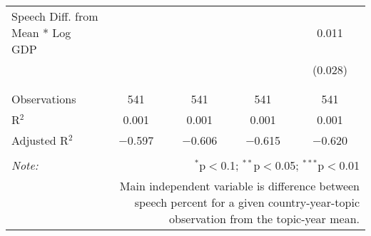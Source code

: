 \begin{table}[!htbp]
\begin{tabular}{@{\extracolsep{5pt}}lcccc}
 Speech Diff. from Mean * Log GDP &  &  &  & 0.011 \\ 
  &  &  &  & (0.028) \\ 
  & & & & \\ 
\hline \\[-1.8ex] 
Observations & 541 & 541 & 541 & 541 \\ 
R$^{2}$ & 0.001 & 0.001 & 0.001 & 0.001 \\ 
Adjusted R$^{2}$ & $-$0.597 & $-$0.606 & $-$0.615 & $-$0.620 \\ 
\hline 
\hline \\[-1.8ex] 
\textit{Note:}  & \multicolumn{4}{r}{$^{*}$p$<$0.1; $^{**}$p$<$0.05; $^{***}$p$<$0.01} \\ 
 & \multicolumn{4}{r}{Main independent variable is difference between speech percent for a given country-year-topic observation from the topic-year mean.} \\ 
\end{tabular} 
\end{table} 
